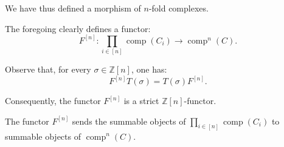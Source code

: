 We have thus defined a morphism of $n$-fold complexes.

The foregoing clearly defines a functor:
\begin{equation}
  F^{[n]}\colon
  \prod_{i\in[n]}\operatorname{comp}(C_i)
  \longrightarrow \operatorname{comp}^{n}(C).
  \tag{2.4.2.4}
\end{equation}

Observe that, for every $\sigma\in\mathbb Z[n]$, one has:
\begin{equation}
  F^{[n]}T(\sigma)=T(\sigma)F^{[n]}.
  \tag{2.4.2.5}
\end{equation}

Consequently, the functor $F^{[n]}$ is a strict $\mathbb Z[n]$-functor.

The functor $F^{[n]}$ sends the summable objects of
$\prod_{i\in[n]}\operatorname{comp}(C_i)$ to summable objects of
$\operatorname{comp}^{n}(C)$.
